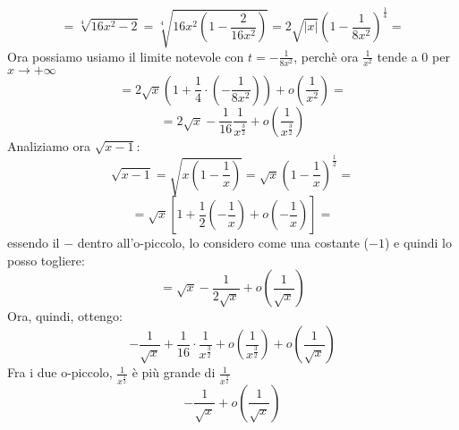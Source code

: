 \[
    = \sqrt[4]{16x^2-2} = \sqrt[4]{16x^2(1-\frac{2}{16x^2})} = 2 \sqrt{|x|} (1- \frac{1}{8x^2})^{\frac{1}{4}} = 
\]
Ora possiamo usiamo il limite notevole con $t = -\frac{1}{8x^2}$, perchè ora $\frac{1}{x^2}$ tende a $0$ per $x\rightarrow + \infty$
\[
    = 2\sqrt{x}(1+\frac{1}{4} \cdot (-\frac{1}{8x^2})) + o(\frac{1}{x^2}) =
\]
\[
    = 2 \sqrt{x} - \frac{1}{16} \frac{1}{x^{\frac{3}{2}}} + o(\frac{1}{x^{\frac{3}{2}}})
\]
Analiziamo ora $\sqrt{x-1}$:
\[
    \sqrt{x-1} = \sqrt{x(1-\frac{1}{x})} = \sqrt{x} (1-\frac{1}{x})^{\frac{1}{2}} =
\]
\[
    =\sqrt{x}[ 1 + \frac{1}{2} (-\frac{1}{x}) + o(-\frac{1}{x}) ] = 
\]
essendo il $-$ dentro all'o-piccolo, lo considero come una costante ($-1$) e quindi lo posso togliere:
\[
    =\sqrt{x}  - \frac{1}{2\sqrt{x}}  + o(\frac{1}{\sqrt{x}}) 
\]
Ora, quindi, ottengo:
\[
    -\frac{1}{\sqrt{x}} + \frac{1}{16} \cdot \frac{1}{x^{\frac{3}{2}}} + o(\frac{1}{x^{\frac{3}{2}}}) + o(\frac{1}{\sqrt{x}})
\]
Fra i due o-piccolo, $\frac{1}{x^{\frac{1}{2}}}$ è più grande di $\frac{1}{x^{\frac{3}{2}}}$
\[
    -\frac{1}{\sqrt{x}} + o(\frac{1}{\sqrt{x}})
\]
\newpage
